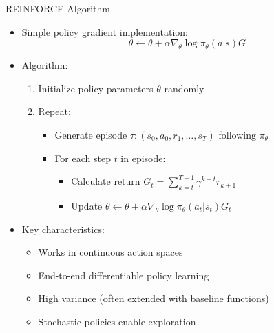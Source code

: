 \documentclass[10pt]{beamer}
\begin{document}
\begin{frame}{REINFORCE Algorithm}
    \begin{itemize}
        \item Simple policy gradient implementation:
        \begin{equation}
            \theta \leftarrow \theta + \alpha \nabla_\theta \log \pi_\theta(a|s) G
        \end{equation}
        
        \item Algorithm:
        \begin{enumerate}
            \item Initialize policy parameters $\theta$ randomly
            \item Repeat:
            \begin{itemize}
                \item Generate episode $\tau: (s_0, a_0, r_1, \ldots, s_T)$ following $\pi_\theta$
                \item For each step $t$ in episode:
                \begin{itemize}
                    \item Calculate return $G_t = \sum_{k=t}^{T-1} \gamma^{k-t} r_{k+1}$
                    \item Update $\theta \leftarrow \theta + \alpha \nabla_\theta \log \pi_\theta(a_t|s_t) G_t$
                \end{itemize}
            \end{itemize}
        \end{enumerate}
        
        \item Key characteristics:
        \begin{itemize}
            \item Works in continuous action spaces
            \item End-to-end differentiable policy learning
            \item High variance (often extended with baseline functions)
            \item Stochastic policies enable exploration
        \end{itemize}
    \end{itemize}
\end{frame}

\end{document}
